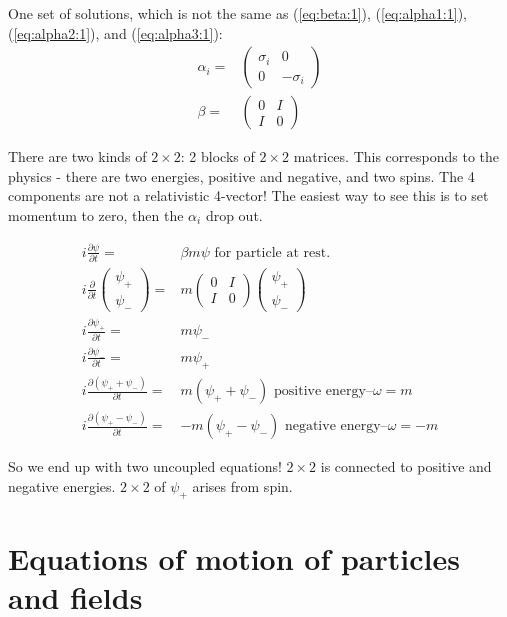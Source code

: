 \documentclass[]{article}
\begin{document}
One set of solutions, which is not the same as (\ref{eq:beta:1}), (\ref{eq:alpha1:1}), (\ref{eq:alpha2:1}), and (\ref{eq:alpha3:1}):
\begin{align*}
	\alpha_i=&\begin{pmatrix}
		\sigma_i&0\\
		0&-\sigma_i
	\end{pmatrix}\\
	\beta =& \begin{pmatrix}
		0&I\\
		I&0
	\end{pmatrix}
\end{align*}

There are two kinds of $2\times2$: 2 blocks of $2\times2$ matrices. This corresponds to the physics - there are two energies, positive and negative, and two spins.
The 4 components are not a relativistic 4-vector! The easiest way to see this is to set momentum to zero, then the $\alpha_i$ drop out.

\begin{align*}
i \frac{\partial \psi}{\partial t} =&  \beta m \psi \text{ for particle at rest.}\\
i \frac{\partial}{\partial t}\begin{pmatrix}
\psi_+\\
\psi_-
\end{pmatrix}=&m \begin{pmatrix}
0&I\\
I&0
\end{pmatrix}\begin{pmatrix}
\psi_+\\
\psi_-
\end{pmatrix}\\
i \frac{\partial \psi_+}{\partial t} =&   m \psi_-\\
i \frac{\partial \psi_-}{\partial t} =&   m \psi_+ \\
i \frac{\partial (\psi_++\psi_-)}{\partial t} =&   m (\psi_++\psi_-) \text{ positive energy--$\omega=m$}\\
i \frac{\partial (\psi_+-\psi_-)}{\partial t} =&   -m (\psi_+-\psi_-) \text{ negative energy--$\omega=-m$}
\end{align*}

So we end up with two uncoupled equations! $2\times2$ is connected to positive and negative energies. $2\times2$ of $\psi_+$ arises from spin.


\section{Equations of motion of particles and fields}
\end{document}
